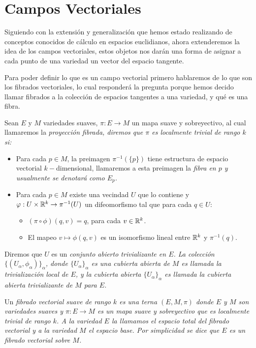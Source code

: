 \section{Campos Vectoriales}\label{Sección: Campos Vectoriales}
Siguiendo con la extensión y generalización que hemos estado realizando de conceptos conocidos de cálculo en espacios euclidianos, ahora extenderemos la idea de los campos vectoriales, estos objetos nos darán una forma de asignar a cada punto de una variedad un vector del espacio tangente.

Para poder definir lo que es un campo vectorial primero hablaremos de lo que son los fibrados vectoriales, lo cual responderá la pregunta porque hemos decido llamar fibrados a la colección de espacios tangentes a una variedad, y qué es una fibra.

\begin{definition}
 Sean $E$ y $M$ variedades suaves, $\pi: E \to M$ un mapa suave y sobreyectivo, al cual llamaremos la \it{proyección fibrada}, diremos que $\pi$ es \it{localmente trivial de rango $k$} si:
 
\begin{itemize}
\item Para cada $p \in M$, la preimagen $\pi^{-1}(\{p\})$ tiene estructura de  espacio vectorial $k-$dimensional, llamaremos a esta preimagen la \it{fibra en $p$} y usualmente se denotará como $E_p$.

\item Para cada $p \in M$ existe una vecindad $U$ que lo contiene y $\varphi: U \times \mathbb{R}^{k} \to \pi^{-1}(U)$ un difeomorfismo tal que para cada $q \in U$:
\begin{itemize}
    \item $(\pi \circ \phi)(q,v) = q$, para cada $v \in \mathbb{R}^{k}$.
    \item El mapeo $v \mapsto \phi(q,v)$ es un isomorfismo lineal entre $\mathbb{R}^{k}$ y $\pi^{-1}(q)$.
\end{itemize}
\end{itemize}

  Diremos que $U$ es un \it{conjunto abierto trivializante} en $E$. La colección $\{(U_\alpha, \phi_\alpha)\}_{\alpha}$, donde $\{U_{\alpha}\}_{\alpha}$ es una cubierta abierta de $M$ es llamada la trivialización local de $E$, y la cubierta abierta $\{U_\alpha\}_{\alpha}$ es llamada la cubierta abierta trivializante de $M$ para $E$.

  Un \it{fibrado vectorial suave de rango $k$} es una terna $(E,M,\pi)$ donde $E$ y $M$ son variedades suaves y $\pi: E \to M$ es un mapa suave y sobreyectivo que es localmente trivial de rango $k$. A la variedad $E$ la llamamos el \it{espacio total} del fibrado vectorial y a la variedad $M$ el \it{espacio base}. Por simplicidad se dice que $E$ es un fibrado vectorial sobre $M$.
\end{definition}

